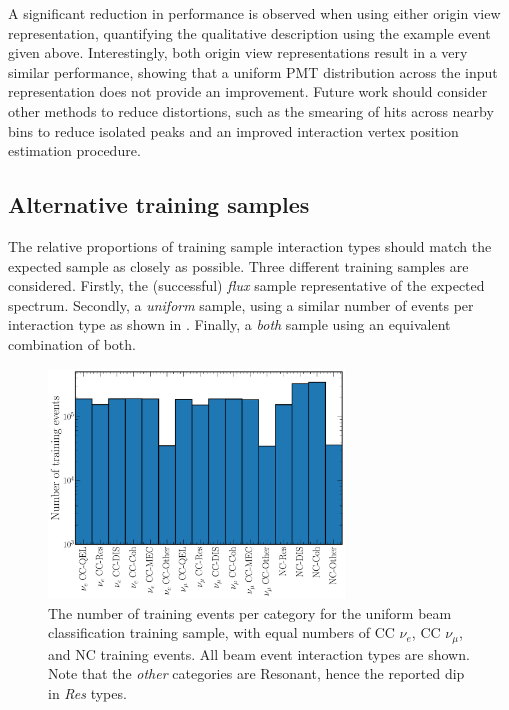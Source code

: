 A significant reduction in performance is observed when using either origin view representation,
quantifying the qualitative description using the example event given above. Interestingly, both
origin view representations result in a very similar performance, showing that a uniform PMT
distribution across the input representation does not provide an improvement. Future work should
consider other methods to reduce distortions, such as the smearing of hits across nearby bins to
reduce isolated peaks and an improved interaction vertex position estimation procedure.

\subsection{Alternative training samples} %
\label{sec:results_samples} %

The relative proportions of training sample interaction types should match the expected sample as
closely as possible. Three different training samples are considered. Firstly, the (successful)
\emph{flux} sample representative of the expected spectrum. Secondly, a \emph{uniform} sample,
using a similar number of events per interaction type as shown in
. Finally, a \emph{both} sample using an equivalent
combination of both.

\begin{figure} %
    \includegraphics[width=0.7\textwidth]{diagrams/7-results/explore_uniform_training_sample.pdf}
    \caption[Number of training events per category for the uniform beam classification network
        training sample] {The number of training events per category for the uniform beam
        classification training sample, with equal numbers of CC $\nu_{e}$, CC $\nu_{\mu}$, and NC
        training events. All beam event interaction types are shown. Note that the \emph{other}
        categories are Resonant, hence the reported dip in \emph{Res} types.}
    \label{fig:explore_uniform_training_sample}
\end{figure}

